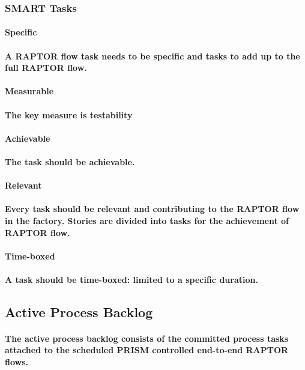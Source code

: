 \documentclass{acm_proc_article-sp}
\begin{document}
\subsubsection{SMART Tasks}
\paragraph{Specific}
\paragraph{A RAPTOR flow task needs to be specific and tasks to add up to the full RAPTOR flow.}
\paragraph{Measurable}
\paragraph{The key measure is testability}
\paragraph{Achievable}
\paragraph{The task should be achievable.}
\paragraph{Relevant}
\paragraph{Every task should be relevant and contributing to the RAPTOR flow in the factory. Stories are divided into tasks for the achievement of RAPTOR flow.}
\paragraph{Time-boxed}
\paragraph{A task should be time-boxed: limited to a specific duration.}
\subsection{Active Process Backlog}
\paragraph{The active process backlog consists of the committed process tasks attached to the scheduled PRISM controlled end-to-end RAPTOR flows.}
\end{document}
